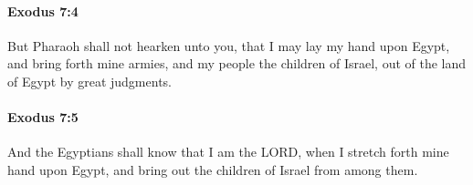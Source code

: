		\paragraph{Exodus 7:4} %
			\label{EXODUS-7-4}

			But Pharaoh shall not hearken unto you, that I may lay my hand upon Egypt, and bring forth mine armies, and my people the children of Israel, out of the land of Egypt by great judgments.


		\paragraph{Exodus 7:5} %
			\label{EXODUS-7-5}

			And the Egyptians shall know that I am the LORD, when I stretch forth mine hand upon Egypt, and bring out the children of Israel from among them.


